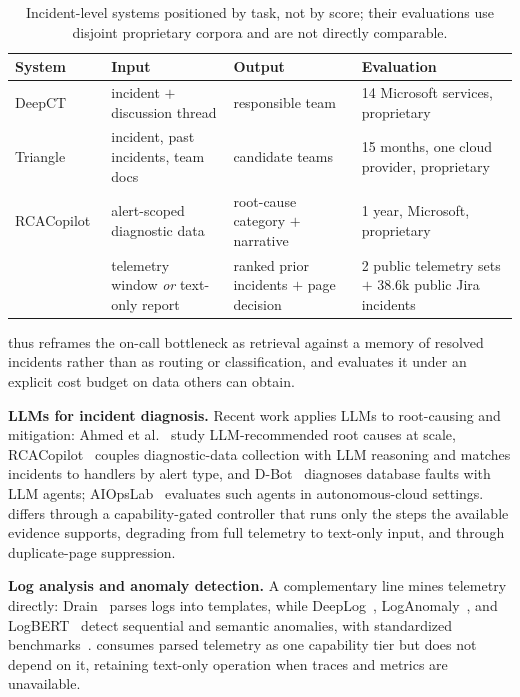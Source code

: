 \begin{table}[t]
\centering
\caption{Incident-level systems positioned by task, not by score; their
evaluations use disjoint proprietary corpora and are not directly comparable.}
\label{tab:systems}
\footnotesize
\setlength{\tabcolsep}{3pt}
\begin{tabular}{@{}p{1.45cm}p{1.9cm}p{1.6cm}p{2.4cm}@{}}
\toprule
System & Input & Output & Evaluation \\
\midrule
DeepCT~\cite{chen2019triage} & incident $+$ discussion thread & responsible team & 14 Microsoft services, proprietary \\
Triangle~\cite{yu2025triangle} & incident, past incidents, team docs & candidate teams & 15 months, one cloud provider, proprietary \\
RCACopilot~\cite{chen2024rcacopilot} & alert-scoped diagnostic data & root-cause category $+$ narrative & 1 year, Microsoft, proprietary \\
\textbf{\sys{}} & telemetry window \emph{or} text-only report & ranked prior incidents $+$ page decision & 2 public telemetry sets $+$ 38.6k public Jira incidents \\
\bottomrule
\end{tabular}
\end{table}

\sys{} thus reframes the on-call bottleneck as retrieval against a memory of
resolved incidents rather than as routing or classification, and evaluates it
under an explicit cost budget on data others can obtain.

\noindent\textbf{LLMs for incident diagnosis.} Recent work applies LLMs to root-causing and mitigation: Ahmed et al.~\cite{ahmed2023rootcause}
study LLM-recommended root causes at scale, RCACopilot~\cite{chen2024rcacopilot}
couples diagnostic-data collection with LLM reasoning and matches incidents to
handlers by alert type, and D-Bot~\cite{zhou2024dbot} diagnoses database faults
with LLM agents; AIOpsLab~\cite{chen2025aiopslab} evaluates such agents in
autonomous-cloud settings. \sys{} differs through a capability-gated controller
that runs only the steps the available evidence supports, degrading from full
telemetry to text-only input, and through duplicate-page suppression.

\noindent\textbf{Log analysis and anomaly detection.} A complementary line mines
telemetry directly: Drain~\cite{he2017drain} parses logs into templates, while
DeepLog~\cite{du2017deeplog}, LogAnomaly~\cite{meng2019loganomaly}, and
LogBERT~\cite{guo2021logbert} detect sequential and semantic anomalies, with
standardized benchmarks~\cite{zhu2019logparsing,he2016experience,zhu2023loghub}.
\sys{} consumes parsed telemetry as one capability tier but does not depend on it,
retaining text-only operation when traces and metrics are unavailable.

